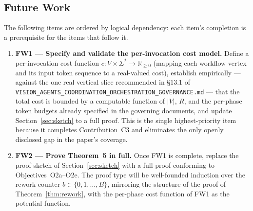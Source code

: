 \documentclass[12pt]{article}
\theoremstyle{definition}
\newcommand{\code}[1]{\texttt{#1}}
\newcommand{\VisionGov}{\code{VISION\_AGENTS\_\allowbreak COORDINATION\_\allowbreak ORCHESTRATION\_\allowbreak GOVERNANCE.md}}
\begin{document}
\subsection{Future Work}
\label{sec:conclusion:futurework}

The following items are ordered by logical dependency: each item's
completion is a prerequisite for the items that follow it.

\begin{enumerate}

    \item \textbf{FW1 --- Specify and validate the per-invocation cost
          model.}
          Define a per-invocation cost function
          $c : V \times \Sigma^{*} \to \mathbb{R}_{\geq 0}$
          (mapping each workflow vertex and its input token sequence to
          a real-valued cost), establish empirically --- against the
          one real vertical slice recommended in \S13.1 of \VisionGov{}
          --- that the total cost is bounded by a computable function of
          $|V|$, $R$, and the per-phase token budgets already specified
          in the governing documents, and update Section~\ref{sec:sketch}
          to a full proof.
          This is the single highest-priority item because it completes
          Contribution~C3 and eliminates the only openly disclosed gap
          in the paper's coverage.

    \item \textbf{FW2 --- Prove Theorem~5 in full.}
          Once FW1 is complete, replace the proof sketch of
          Section~\ref{sec:sketch} with a full proof conforming to
          Objectives~O2a--O2e.  The proof type will be
          well-founded induction over the rework counter
          $b \in \{0, 1, \ldots, B\}$, mirroring the structure of
          the proof of Theorem~\ref{thm:rework}, with the per-phase
          cost function of FW1 as the potential function.


\end{enumerate}
\end{document}
